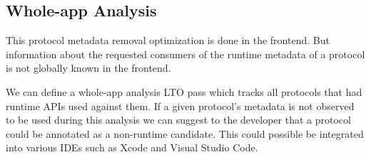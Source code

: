\documentclass{article}
\begin{document}
\subsection{Whole-app Analysis}

This protocol metadata removal optimization is done in the frontend. But
information about the requested consumers of the runtime metadata of a protocol
is not globally known in the frontend.

We can define a whole-app analysis LTO pass which tracks all protocols that had
runtime APIs used against them. If a given protocol's metadata is not observed
to be used during this analysis we can suggest to the developer that a protocol
could be annotated as a non-runtime candidate. This could possible be integrated
into various IDEs such as Xcode and Visual Studio Code.
\end{document}

